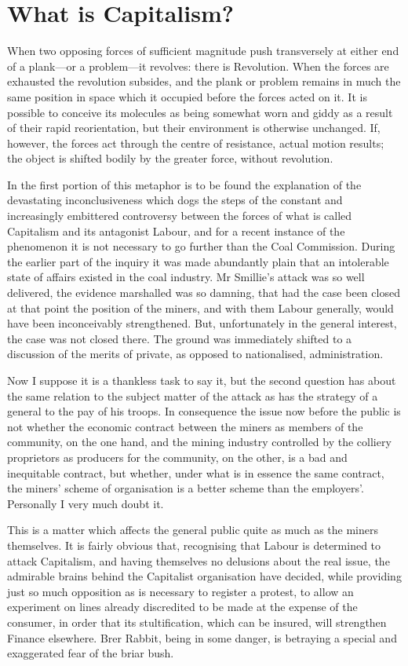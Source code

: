 \documentclass{book}
\begin{document}
\chapter{What is Capitalism?}
\label{chapter-6}
When two opposing forces of sufficient magnitude push transversely at either end of a plank—or a problem—it revolves: there is Revolution. When the forces are exhausted the revolution subsides, and the plank or problem remains in much the same position in space which it occupied before the forces acted on it. It is possible to conceive its molecules as being somewhat worn and giddy as a result of their rapid reorientation, but their environment is otherwise unchanged. If, however, the forces act through the centre of resistance, actual motion results; the object is shifted bodily by the greater force, without revolution.

In the first portion of this metaphor is to be found the explanation of the devastating inconclusiveness which dogs the steps of the constant and increasingly embittered controversy between the forces of what is called Capitalism and its antagonist Labour, and for a recent instance of the phenomenon it is not necessary to go further than the Coal Commission. During the earlier part of the inquiry it was made abundantly plain that an intolerable state of affairs existed in the coal industry. Mr Smillie’s attack was so well delivered, the evidence marshalled was so damning, that had the case been closed at that point the position of the miners, and with them Labour generally, would have been inconceivably strengthened. But, unfortunately in the general interest, the case was not closed there. The ground was immediately shifted to a discussion of the merits of private, as opposed to nationalised, administration.

Now I suppose it is a thankless task to say it, but the second question has about the same relation to the subject matter of the attack as has the strategy of a general to the pay of his troops. In consequence the issue now before the public is not whether the economic contract between the miners as members of the community, on the one hand, and the mining industry controlled by the colliery proprietors as producers for the community, on the other, is a bad and inequitable contract, but whether, under what is in essence the same contract, the miners’ scheme of organisation is a better scheme than the employers’. Personally I very much doubt it.

This is a matter which affects the general public quite as much as the miners themselves. It is fairly obvious that, recognising that Labour is determined to attack Capitalism, and having themselves no delusions about the real issue, the admirable brains behind the Capitalist organisation have decided, while providing just so much opposition as is necessary to register a protest, to allow an experiment on lines already discredited to be made at the expense of the consumer, in order that its stultification, which can be insured, will strengthen Finance elsewhere. Brer Rabbit, being in some danger, is betraying a special and exaggerated fear of the briar bush.
\end{document}
